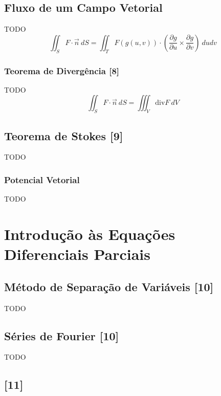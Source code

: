\documentclass[11pt, a4paper]{article}
\begin{document}
\subsection{Fluxo de um Campo Vetorial}

TODO
\begin{equation*}
    \iint_{S} F \cdot \vec{n} \ dS =
    \iint_{T} F(g(u, v)) \cdot
    \left(
    \frac{\partial g}{\partial u} \times \frac{\partial g}{\partial v}
    \right) \ dudv
\end{equation*}

\subsubsection{Teorema de Divergência [8]}

TODO
\begin{equation*}
    \iint_{S} F \cdot \vec{n} \ dS =
    \iiint_{V} \text{div} F \ dV
\end{equation*}

\subsection{Teorema de Stokes [9]}

TODO

\subsubsection{Potencial Vetorial}

TODO

\newpage


\section{Introdução às Equações Diferenciais Parciais}

\subsection{Método de Separação de Variáveis [10]}

TODO

\subsection{Séries de Fourier [10]}

TODO

\subsection{[11]}
\end{document}
